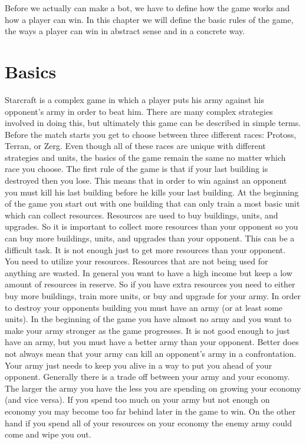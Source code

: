 Before we actually can make a bot, we have to define how the game works and how a player can win.
In this chapter we will define the basic rules of the game, the ways a player can win in abstract sense and in a concrete way.

\section{Basics}
	Starcraft is a complex game in which a player puts his army against his opponent's army in order to beat him. 
	There are many complex strategies involved in doing this, but ultimately this game can be described in simple terms.
	Before the match starts you get to choose between three different races: Protoss, Terran, or Zerg. 
	Even though all of these races are unique with different strategies and units, the basics of the game remain the same no matter which race you choose.
	The first rule of the game is that if your last building is destroyed then you lose. 
	This means that in order to win against an opponent you must kill his last building before he kills your last building. 
	At the beginning of the game you start out with one building that can only train a most basic unit which can collect resources. 
	Resources are used to buy buildings, units, and upgrades. 
	So it is important to collect more resources than your opponent so you can buy more buildings, units, and upgrades than your opponent.
	This can be a difficult task. It is not enough just to get more resources than your opponent. 
	You need to utilize your resources. Resources that are not being used for anything are wasted. 
	In general you want to have a high income but keep a low amount of resources in reserve. 
	So if you have extra resources you need to either buy more buildings, train more units, or buy and upgrade for your army.
	In order to destroy your opponents building you must have an army (or at least some units). 
	In the beginning of the game you have almost no army and you want to make your army stronger as the game progresses. 
	It is not good enough to just have an army, but you must have a better army than your opponent. 
	Better does not always mean that your army can kill an opponent's army in a confrontation. 
	Your army just needs to keep you alive in a way to put you ahead of your opponent.
	Generally there is a trade off between your army and your economy. 
	The larger the army you have the less you are spending on growing your economy (and vice versa). 
	If you spend too much on your army but not enough on economy you may become too far behind later in the game to win. 
	On the other hand if you spend all of your resources on your economy the enemy army could come and wipe you out.

 